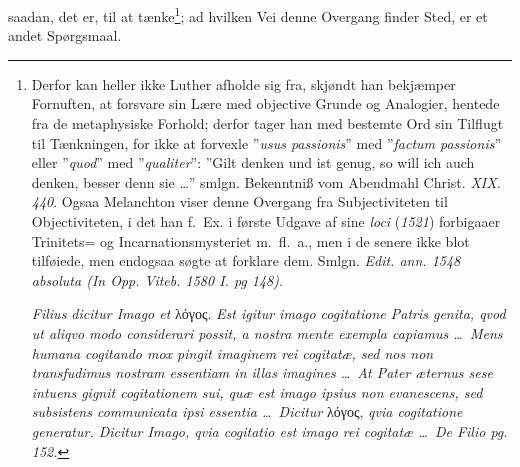 \documentclass[12pt]{book}
\begin{document}
saadan, det er, til at tænke\footnote{Derfor kan heller ikke Luther afholde
sig fra, skjøndt han bekjæmper Fornuften, at forsvare sin Lære med objective
Grunde og Analogier, hentede fra de metaphysiske Forhold; derfor tager han
med bestemte Ord sin Tilflugt til Tænkningen, for ikke at forvexle
”\textit{usus passionis}” med ”\textit{factum passionis}” eller
”\textit{quod}” med ”\textit{qualiter}”: ”Gilt denken und ist genug, so will
ich auch denken, besser denn sie \ldots” smlgn. Bekenntniß vom Abendmahl
Christ. \textit{XIX. 440}. Ogsaa Melanchton viser denne Overgang fra
Subjectiviteten til Objectiviteten, i det han f.~Ex. i første Udgave af sine
\textit{loci} (\textit{1521}) forbigaaer Trinitets= og Incarnationsmysteriet
m.~fl.~a., men i de senere ikke blot tilføiede, men endogsaa søgte at
forklare dem. Smlgn. \textit{Edit. ann. 1548 absoluta (In Opp. Viteb. 1580 I.
pg 148)}.

\textit{Filius dicitur Imago et} λόγος. \textit{Est igitur imago cogitatione
Patris genita, qvod ut aliqvo modo considerari possit, a nostra mente exempla
capiamus \ldots\ Mens humana cogitando mox pingit imaginem rei cogitatæ, sed
nos non transfudimus nostram essentiam in illas imagines \ldots\ At Pater
æternus sese intuens gignit cogitationem sui, quæ est imago ipsius non
evanescens, sed subsistens communicata ipsi essentia \ldots\ Dicitur} λόγος,
\textit{qvia cogitatione generatur. Dicitur Imago, qvia cogitatio est imago
rei cogitatæ \ldots\ De Filio pg. 152.}}; ad hvilken Vei denne Overgang
finder Sted, er et andet Spørgsmaal.
\end{document}
